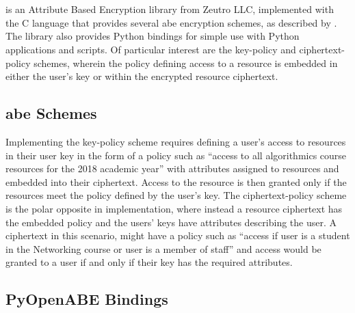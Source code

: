 \section{\OpenABE}
\label{sec:bkgr_openabe}

\OpenABE is an Attribute Based Encryption library from Zeutro LLC, implemented with the C language that provides several \acrshort{abe} encryption schemes, as described by \citet{Akinyele2011}. The library also provides Python bindings for simple use with Python applications and scripts. Of particular interest are the key-policy and ciphertext-policy schemes, wherein the policy defining access to a resource is embedded in either the user's key or within the encrypted resource ciphertext.

\subsection{\acrshort{abe} Schemes}
\label{subsec:bkgr_openabe_schemes}

Implementing the key-policy scheme requires defining a user's access to resources in their user key in the form of a policy such as ``access to all algorithmics course resources for the 2018 academic year'' with attributes assigned to resources and embedded into their ciphertext. Access to the resource is then granted only if the resources meet the policy defined by the user's key. The ciphertext-policy scheme is the polar opposite in implementation, where instead a resource ciphertext has the embedded policy and the users' keys have attributes describing the user. A ciphertext in this scenario, might have a policy such as ``access if user is a student in the Networking course or user is a member of staff'' and access would be granted to a user if and only if their key has the required attributes.

\subsection{PyOpenABE Bindings}
\label{subsec:bkgr_pyopenabe}

